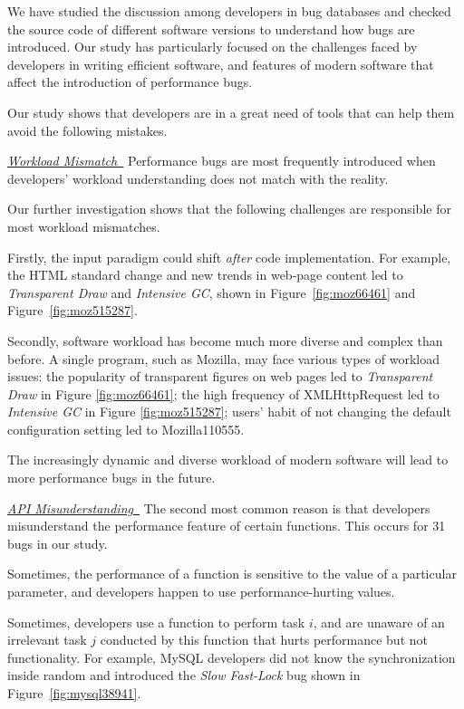 We have studied the discussion among developers in bug databases and checked the 
source code of different software versions to understand how bugs are introduced. 
Our study has particularly focused on the challenges faced by developers in writing 
efficient software, and features of modern software that affect the introduction
of performance bugs. 

Our study shows that developers are in a great need of tools that can help them 
avoid the following mistakes.

\underline{\it Workload Mismatch\ }
Performance bugs are most frequently introduced when 
developers' workload understanding does not match with the reality.

Our further investigation shows that the following challenges
are responsible for most workload mismatches.

Firstly, the input paradigm could shift {\it after}
code implementation. For example, the HTML standard change and new trends in 
web-page content led to {\it Transparent Draw} and
{\it Intensive GC}, shown
in Figure~\ref{fig:moz66461} and Figure~\ref{fig:moz515287}.

Secondly, software workload has become much more diverse and complex than 
before.
A single program, such as Mozilla, may face various types of workload issues:
the popularity of transparent figures on web pages led
to {\it Transparent Draw} 
in Figure \ref{fig:moz66461}; the high frequency of XMLHttpRequest led to
{\it Intensive GC}
in Figure \ref{fig:moz515287}; users' habit of not changing the default
configuration setting led to Mozilla110555. 

The increasingly dynamic and diverse workload of modern software will lead
to more performance bugs in the future.

\underline{\it API Misunderstanding\ }
The second most common reason is that
developers misunderstand the performance feature of certain
functions. This occurs for 31 bugs in our study.

Sometimes, the performance of a function is sensitive to the value of a
particular parameter, and developers happen to use performance-hurting values. 

Sometimes, developers use a function to perform task $i$, and are unaware of
an irrelevant task $j$ 
conducted by this function that hurts performance but not functionality. 
For example, MySQL developers did not know the synchronization inside
random and introduced the {\it Slow Fast-Lock} bug shown in 
Figure~\ref{fig:mysql38941}. 


